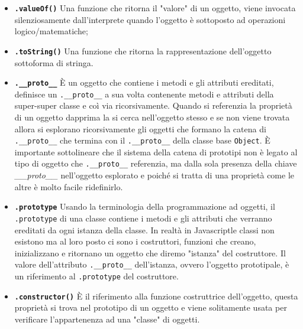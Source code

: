 \documentclass{sapthesis}
\newcommand{\bold}[1]{\textbf{#1}}
\newcommand{\code}[1]{\texttt{#1}}
\newcommand{\method}[1]{\code{.#1()}}
\newcommand{\attr}[1]{\code{.#1}}
\newcommand{\JS}{Javascript}
\begin{document}
        \begin{itemize}
            \item \bold{\method{valueOf}} Una funzione che ritorna il "valore" di un oggetto, viene invocata
                    silenziosamente dall'interprete quando l'oggetto è sottoposto ad operazioni logico/matematiche;

            \item \bold{\method{toString}} Una funzione che ritorna la rappresentazione dell'oggetto
                    sottoforma di stringa.

            \item \bold{\attr{\_\_proto\_\_}} È un oggetto che contiene i metodi e gli attributi ereditati, 
                    definisce un \attr{\_\_proto\_\_} a sua volta contenente metodi e attributi della super-super classe 
                    e coì via ricorsivamente. Quando si referenzia la proprietà di un oggetto dapprima la si cerca
                    nell'oggetto stesso e se non viene trovata allora si esplorano ricorsivamente gli oggetti che
                    formano la catena di \attr{\_\_proto\_\_} che termina con il \attr{\_\_proto\_\_} della classe
                    base \code{Object}. È importante sottolineare che il sistema della catena di prototipi non è
                    legato al tipo di oggetto che \attr{\_\_proto\_\_} referenzia, ma dalla sola presenza della chiave 
                    \textit{\_\_proto\_\_} nell'oggetto esplorato e poiché si tratta di una proprietà come le altre
                     è molto facile ridefinirlo.

            \item \bold{\attr{prototype}} Usando la terminologia della programmazione ad oggetti, il \attr{prototype}
                    di una classe contiene i metodi e gli attributi che verranno ereditati da ogni istanza della classe.
                    In realtà in \JS le classi non esistono ma al loro posto ci sono i costruttori, funzioni che creano,
                    inizializzano e ritornano un oggetto che diremo "istanza" del costruttore. Il valore dell'attributo \attr{\_\_proto\_\_}
                    dell'istanza, ovvero l'oggetto prototipale, è un riferimento al \attr{prototype} del costruttore.
            
            \item \bold{\method{constructor}} È il riferimento alla funzione costruttrice dell'oggetto, questa proprietà
                    si trova nel prototipo di un oggetto e viene solitamente usata per verificare l'appartenenza ad una
                    "classe" di oggetti.
        \end{itemize}
\end{document}
